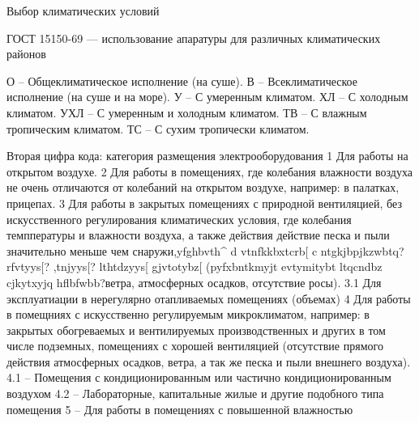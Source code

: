 \documentclass{article}
\begin{document}
Выбор климатических условий

ГОСТ 15150-69 --- использование апаратуры для различных климатических районов

О -- Общеклиматическое исполнение (на суше).
В -- Всеклиматическое исполнение (на суше и на море).
У -- С умеренным климатом.
ХЛ -- С холодным климатом.
УХЛ -- С умеренным и холодным климатом.
ТВ -- С влажным тропическим климатом.
ТС -- С сухим тропически климатом.

Вторая цифра кода: категория размещения электрооборудования
1 Для работы на открытом воздухе.
2 Для работы в помещениях, где колебания влажности воздуха не очень отличаются от колебаний на открытом воздухе, например: в палатках, прицепах.
3 Для работы в закрытых помещениях с природной вентиляцией, без искусственного регулирования климатических условия, где колебания темппературы и влажности воздуха, а также действия действие песка и пыли значительно меньше чем снаружи,yfghbvth^ d vtnfkkbxtcrb[ c ntgkjbpjkzwbtq? rfvtyys[? ,tnjyys[? lthtdzyys[ gjvtotybz[ (pyfxbntkmyjt evtymitybt ltqcndbz cjkytxyjq hflbfwbb?ветра, атмосферных осадков, отсутствие росы).
3.1 Для эксплуатиации в нерегулярно отапливаемых помещениях (объемах)
4 Для работы в помещниях с искусственно регулируемым микроклиматом, например: в закрытых обогреваемых и вентилируемых производственных и других в том числе подземных, помещениях с хорошей вентиляцией (отсутствие прямого действия атмосферных осадков, ветра, а так же песка и пыли внешнего воздуха).
4.1 -- Помещения с кондиционированным или частично кондиционированным воздухом
4.2 -- Лабораторные, капитальные жилые и другие подобного типа помещения
5 -- Для работы в помещениях с повышенной влажностью
\end{document}
